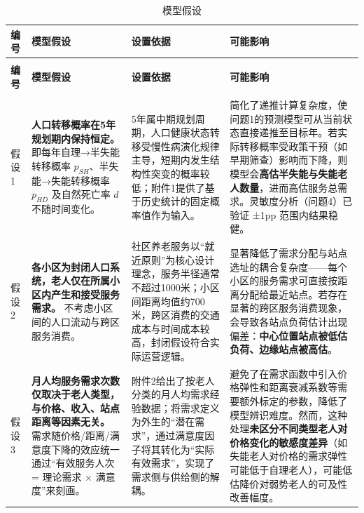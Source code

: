 \documentclass[UTF8]{ctexart}
\begin{document}
{\small
\renewcommand{\arraystretch}{1.3}
\begin{longtable}{|>{\centering\arraybackslash}p{1.5cm}|>{\centering\arraybackslash}p{4cm}|>{\centering\arraybackslash}p{4cm}|>{\centering\arraybackslash}p{3cm}|}
\caption{模型假设}
\label{tab:assumptions}\\
\hline
\textbf{编号} & \textbf{模型假设} & \textbf{设置依据} & \textbf{可能影响} \\
\hline
\endfirsthead

\multicolumn{4}{c}{续表} \\
\hline
\textbf{编号} & \textbf{模型假设} & \textbf{设置依据} & \textbf{可能影响} \\
\hline
\endhead

\hline
\multicolumn{4}{r}{{续下页}} \\
\endfoot

\hline
\endlastfoot

假设1 & \textbf{人口转移概率在5年规划期内保持恒定。} 即每年自理→半失能转移概率 $p_{SH}$、半失能→失能转移概率 $p_{HD}$ 及自然死亡率 $d$ 不随时间变化。 & 5年属中期规划周期，人口健康状态转移受慢性病演化规律主导，短期内发生结构性突变的概率较低；附件1提供了基于历史统计的固定概率值作为输入。 & 简化了递推计算复杂度，使问题1的预测模型可从当前状态直接递推至目标年。若实际转移概率受政策干预（如早期筛查）影响而下降，则模型会\textbf{高估半失能与失能老人数量}，进而高估服务总需求。灵敏度分析（问题4）已验证 ±1pp 范围内结果稳健。 \\

假设2 & \textbf{各小区为封闭人口系统，老人仅在所属小区内产生和接受服务需求。} 不考虑小区间的人口流动与跨区服务消费。 & 社区养老服务以“就近原则”为核心设计理念，服务半径通常不超过1000米；小区间距离均值约700米，跨区消费的交通成本与时间成本较高，封闭假设符合实际运营逻辑。 & 显著降低了需求分配与站点选址的耦合复杂度——每个小区的服务需求可直接按距离分配给最近站点。若存在显著的跨区服务消费现象，会导致各站点负荷估计出现偏差：\textbf{中心位置站点被低估负荷、边缘站点被高估}。 \\

假设3 & \textbf{月人均服务需求次数仅取决于老人类型，与价格、收入、站点距离等因素无关。} 需求随价格/距离/满意度下降的效应统一通过“有效服务人次 = 理论需求 × 满意度”来刻画。 & 附件2给出了按老人分类的月人均需求经验数据；将需求定义为外生的“潜在需求”，通过满意度因子将其转化为“实际有效需求”，实现了需求侧与供给侧的解耦。 & 避免了在需求函数中引入价格弹性和距离衰减系数等需要额外标定的参数，降低了模型辨识难度。然而，这种处理\textbf{未区分不同类型老人对价格变化的敏感度差异}（如失能老人对价格的需求弹性可能低于自理老人），可能低估降价对弱势老人的可及性改善幅度。 \\


\end{longtable}}
\end{document}
